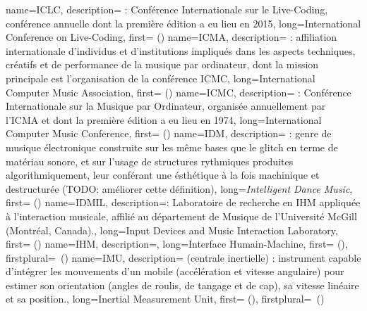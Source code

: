 {
    name={ICLC},
    description={\textit{} : Conférence Internationale sur le Live-Coding, conférence annuelle dont la première édition a eu lieu en 2015},
    long={International Conference on Live-Coding},
    first={ ()}
}
{
    name={ICMA},
    description={\textit{} : affiliation internationale d'individus et d'institutions impliqués dans les aspects techniques, créatifs et de performance de la musique par ordinateur, dont la mission principale est l'organisation de la conférence \gls{ICMC}},
    long={International Computer Music Association},
    first={ ()}
}
{
    name={ICMC},
    description={\textit{} : Conférence Internationale sur la Musique par Ordinateur, organisée annuellement par l'\gls{ICMA} et dont la première édition a eu lieu en 1974},
    long={International Computer Music Conference},
    first={ ()}
}
{
    name={IDM},
    description={\textit{} : genre de musique électronique construite sur les même bases que le \gls{glitch} en terme de matériau sonore, et sur l'usage de structures rythmiques produites algorithmiquement, leur conférant une ésthétique à la fois machinique et destructurée (TODO: améliorer cette définition)},
    long={\textit{Intelligent Dance Music}},
    first={ ()}
}
{
    name={IDMIL},
    description={\textit{}: Laboratoire de recherche en \gls{IHM} appliquée à l'interaction musicale, affilié au département de Musique de l'Université McGill (Montréal, Canada).},
    long={Input Devices and Music Interaction Laboratory},
    first={ ()}
}
{
    name={IHM},
    description={\textit{}},
    long={Interface Humain-Machine},
    first={ ()},
    firstplural={\glspluralsuffix\ (\glspluralsuffix)}
}
{
    name={IMU},
    description={\textit{} (centrale inertielle) : instrument capable d'intégrer les mouvements d'un mobile (accélération et vitesse angulaire) pour estimer son orientation (angles de roulis, de tangage et de cap), sa vitesse linéaire et sa position.},
    long={Inertial Measurement Unit},
    first={ ()},
    firstplural={\glspluralsuffix\ (\glspluralsuffix)}
}

